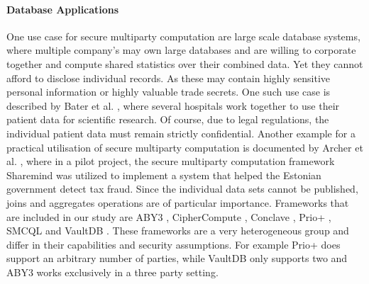 \paragraph{Database Applications}
One use case for secure multiparty computation are large scale database systems, where multiple company's may own large databases and are willing to corporate together and compute shared statistics over their combined data. Yet they cannot afford to disclose individual records. As these may contain highly sensitive personal information or highly valuable trade secrets. One such use case is described by Bater et al. \cite{bater}, where several hospitals work together to use their patient data for scientific research. Of course, due to legal regulations, the individual patient data must remain strictly confidential. Another example for a practical utilisation of secure multiparty computation is documented by Archer et al. \cite{Archer2018FromKT}, where in a pilot project, the secure multiparty computation framework Sharemind \cite{bogdanov2015estonian} was utilized to implement a system that helped the Estonian government detect tax fraud. Since the individual data sets cannot be published, joins and aggregates operations are of particular importance. Frameworks that are included in our study are ABY3 \cite{aby3}, CipherCompute \cite{Cosmian}, Conclave \cite{10.1145/3302424.3303982}, Prio+ \cite{cryptoeprint:2021:576} , SMCQL \cite{bater} and VaultDB \cite{rogers2022vaultdb}. These frameworks are a very heterogeneous group and differ in their capabilities and security assumptions. For example Prio+ does support an arbitrary number of parties, while VaultDB only supports two and ABY3 works exclusively in a three party setting.












